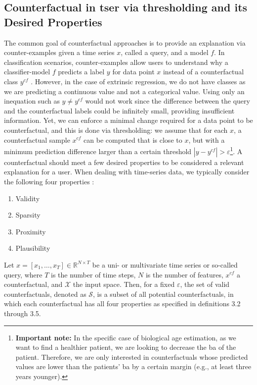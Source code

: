 \subsection{Counterfactual in \gls{tser} via thresholding and its Desired Properties} 
\label{sec:methods:tser_threshold}
The common goal of counterfactual approaches is to provide an explanation via counter-examples given a time series $x$, called a query, and a model $f$. In classification scenarios, counter-examples allow users to understand why a classifier-model $f$ predicts a label $y$ for data point $x$ instead of a counterfactual class $y^{c f}$ \cite{wachter_counterfactual_2018}. However, in the case of extrinsic regression, we do not have classes as we are predicting a continuous value and not a categorical value. Using only an inequation such as $y \neq y^{c f}$  would not work since the difference between the query and the counterfactual labels could be infinitely small, providing insufficient information. Yet, we can enforce a minimal change required for a data point to be counterfactual, and this is done via thresholding: we assume that for each $x$, a counterfactual sample $x^{c f}$ can be computed that is close to $x$, but with a minimum prediction difference larger than a certain threshold $|y - y^{c f}| > \varepsilon$\footnote{\textbf{Important note:} In the specific case of biological age estimation, as we want to find a healthier patient, we are looking to decrease the \gls{ba} of the patient. Therefore, we are only interested in counterfactuals whose predicted values are lower than the patients' \gls{ba} by a certain margin (e.g., at least three years younger).}. A counterfactual should meet a few desired properties to be considered a relevant explanation for a user.
When dealing with time-series data, we typically consider the following four properties \cite{delaney_instance-based_2021}:
\begin{enumerate}
    \item Validity 
    \item Sparsity
    \item Proximity
    \item Plausibility
\end{enumerate}

Let $x=\left[x_{1}, \ldots, x_{T}\right] \in \mathbb{R}^{N \times T}$ be a uni- or multivariate time series or so-called query, where $T$ is the number of time steps, $N$ is the number of features, $x^{cf}$ a counterfactual, and $\mathcal{X}$ the input space.
Then, for a fixed $\varepsilon$, the set of valid counterfactuals, denoted as $\mathcal{S}$, is a subset of all potential counterfactuals, in which each counterfactual has all four properties as specified in definitions 3.2 through 3.5.


